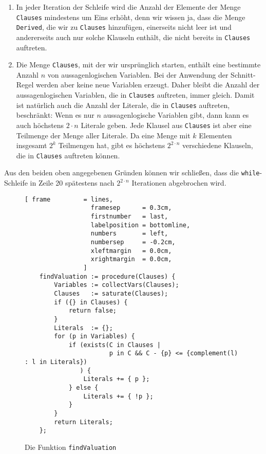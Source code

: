 \begin{enumerate}
\item In jeder Iteration der Schleife wird die Anzahl der Elemente der Menge \texttt{Clauses}
      mindestens um Eins erhöht, denn wir wissen ja, dass die Menge \texttt{Derived}, die wir zu
      \texttt{Clauses} hinzufügen, einerseits nicht leer ist und andererseits auch nur solche
      Klauseln enthält, die nicht bereits in \texttt{Clauses} auftreten.
\item Die Menge \texttt{Clauses}, mit der wir ursprünglich starten, enthält eine bestimmte Anzahl $n$
      von aussagenlogischen Variablen.  Bei der Anwendung der Schnitt-Regel werden aber keine neue
      Variablen erzeugt.  Daher bleibt die Anzahl der aussagenlogischen Variablen, die in
      \texttt{Clauses} auftreten, immer gleich.  Damit ist natürlich auch die Anzahl der Literale,
      die in \texttt{Clauses} auftreten, beschränkt: Wenn es nur $n$ aussagenlogische Variablen gibt,
      dann kann es auch höchstens $2 \cdot n$ Literale geben.  Jede Klausel aus \texttt{Clauses} ist
      aber eine Teilmenge der Menge aller Literale.  Da eine Menge mit $k$ Elementen insgesamt $2^k$
      Teilmengen hat, gibt es höchstens $2^{2 \cdot n}$ verschiedene Klauseln, die in
      \texttt{Clauses} auftreten können.  
\end{enumerate}
Aus den beiden oben angegebenen Gründen können wir schließen, dass die \texttt{while}-Schleife in
Zeile 20 spätestens nach $2^{2 \cdot n}$ Iterationen abgebrochen wird. 

\begin{figure}[!ht]
\centering
\begin{Verbatim}[ frame         = lines, 
                  framesep      = 0.3cm, 
                  firstnumber   = last,
                  labelposition = bottomline,
                  numbers       = left,
                  numbersep     = -0.2cm,
                  xleftmargin   = 0.0cm,
                  xrightmargin  = 0.0cm,
                ]
    findValuation := procedure(Clauses) {
        Variables := collectVars(Clauses);
        Clauses   := saturate(Clauses);
        if ({} in Clauses) {
            return false;
        }
        Literals  := {};
        for (p in Variables) {
            if (exists(C in Clauses |
                       p in C && C - {p} <= {complement(l) : l in Literals})
               ) {
                Literals += { p };
            } else {
                Literals += { !p };
            }
        }
        return Literals;
    };
\end{Verbatim}
\vspace*{-0.3cm}
\caption{Die Funktion \texttt{findValuation}}
\label{fig:completeness.stlx-3}
\end{figure}


